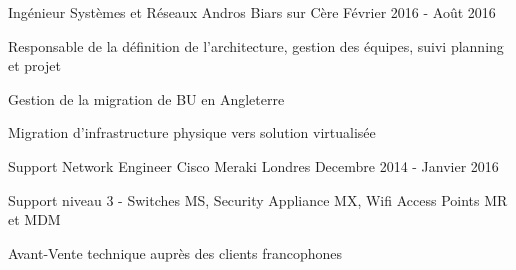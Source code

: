 \begin{cventries}
  \cventry
  {Ingénieur Systèmes et Réseaux} %
  {Andros} %
  {Biars sur Cère} %
  {Février 2016 - Août 2016} %
  {
    \begin{cvitems} %
      \item {Responsable de la définition de l'architecture, gestion des équipes, suivi planning et projet}
      \item {Gestion de la migration de BU en Angleterre}
      \item {Migration d'infrastructure physique vers solution virtualisée}
    \end{cvitems}
}

  \cventry
    {Support Network Engineer} %
    {Cisco Meraki} %
    {Londres} %
    {Decembre 2014 - Janvier 2016} %
    {
      \begin{cvdoubleitems} %
        \item {Support niveau 3 - Switches MS, Security Appliance MX, Wifi Access Points MR et MDM}
        \item {Avant-Vente technique auprès des clients francophones}
      \end{cvdoubleitems}
    }

\end{cventries}
